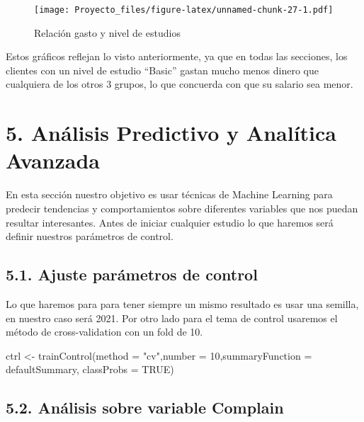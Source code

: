 \documentclass[
]{article}
\newenvironment{Shaded}{\begin{snugshade}}{\end{snugshade}}
\newcommand{\AttributeTok}[1]{\textcolor[rgb]{0.77,0.63,0.00}{#1}}
\newcommand{\ConstantTok}[1]{\textcolor[rgb]{0.00,0.00,0.00}{#1}}
\newcommand{\DecValTok}[1]{\textcolor[rgb]{0.00,0.00,0.81}{#1}}
\newcommand{\FunctionTok}[1]{\textcolor[rgb]{0.00,0.00,0.00}{#1}}
\newcommand{\NormalTok}[1]{#1}
\newcommand{\OtherTok}[1]{\textcolor[rgb]{0.56,0.35,0.01}{#1}}
\newcommand{\StringTok}[1]{\textcolor[rgb]{0.31,0.60,0.02}{#1}}
\begin{document}
\begin{figure}
\centering
\texttt{[image: Proyecto\_files/figure-latex/unnamed-chunk-27-1.pdf]}
\caption{Relación gasto y nivel de estudios}
\end{figure}

Estos gráficos reflejan lo visto anteriormente, ya que en todas las
secciones, los clientes con un nivel de estudio ``Basic'' gastan mucho
menos dinero que cualquiera de los otros 3 grupos, lo que concuerda con
que su salario sea menor.

\newpage

\hypertarget{anuxe1lisis-predictivo-y-analuxedtica-avanzada}{%
\section{5. Análisis Predictivo y Analítica
Avanzada}\label{anuxe1lisis-predictivo-y-analuxedtica-avanzada}}

En esta sección nuestro objetivo es usar técnicas de Machine Learning
para predecir tendencias y comportamientos sobre diferentes variables
que nos puedan resultar interesantes. Antes de iniciar cualquier estudio
lo que haremos será definir nuestros parámetros de control.

\hypertarget{ajuste-paruxe1metros-de-control}{%
\subsection{5.1. Ajuste parámetros de
control}\label{ajuste-paruxe1metros-de-control}}

Lo que haremos para para tener siempre un mismo resultado es usar una
semilla, en nuestro caso será 2021. Por otro lado para el tema de
control usaremos el método de cross-validation con un fold de 10.

\begin{Shaded}
\begin{Highlighting}[]
\NormalTok{ctrl }\OtherTok{\textless{}{-}} \FunctionTok{trainControl}\NormalTok{(}\AttributeTok{method =} \StringTok{"cv"}\NormalTok{,}\AttributeTok{number =} \DecValTok{10}\NormalTok{,}\AttributeTok{summaryFunction =}\NormalTok{ defaultSummary,}
                     \AttributeTok{classProbs =} \ConstantTok{TRUE}\NormalTok{)}
\end{Highlighting}
\end{Shaded}

\hypertarget{anuxe1lisis-sobre-variable-complain}{%
\subsection{5.2. Análisis sobre variable
Complain}\label{anuxe1lisis-sobre-variable-complain}}
\end{document}
